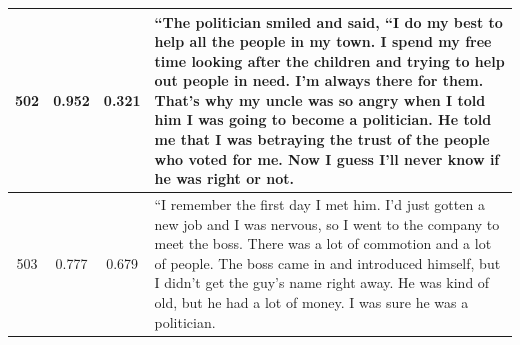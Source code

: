 \begin{table}[ht]
\begin{center}
\begin{tabular}{cccp{8.5cm}}
    502 & 0.952 & 0.321 & “The politician smiled and said, “I do my best to help all the people in my town. I spend my free time looking after the children and trying to help out people in need. I’m always there for them. That’s why my uncle was so angry when I told him I was going to become a politician. He told me that I was betraying the trust of the people who voted for me. Now I guess I’ll never know if he was right or not. \\
    \midrule
    503 & 0.777 & 0.679 & “I remember the first day I met him. I’d just gotten a new job and I was nervous, so I went to the company to meet the boss. There was a lot of commotion and a lot of people. The boss came in and introduced himself, but I didn’t get the guy’s name right away. He was kind of old, but he had a lot of money. I was sure he was a politician. \\
    \bottomrule
  \end{tabular}
  \end{center}
  \label{app:table_iter_stories_ending_replace_zero}
\end{table}

